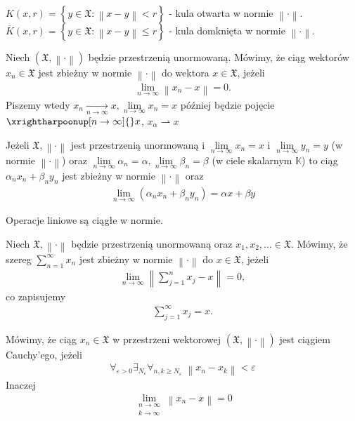 $ K(x,r)=\left\{y\in \mathfrak X:\left\|x-y\right\|<r\right\} $ - kula otwarta w normie $ \left\|\cdot \right\| $.\\
$ \overline K(x,r)=\left\{y\in \mathfrak X:\left\|x-y\right\|\le r\right\} $ - kula domknięta w normie $ \left\|\cdot \right\| $.
\begin{defi}[Zbieżność]
Niech $ \left(\mathfrak X,\left\|\cdot \right\|\right) $ będzie przestrzenią unormowaną. Mówimy, że ciąg wektorów $ x_n\in\mathfrak X $ jest zbieżny w normie $ \left\|\cdot \right\| $ do wektora $ x\in\mathfrak X $, jeżeli
\begin{gather*}
\lim\limits_{n\to\infty} \left\|x_n-x\right\|=0.
\end{gather*}
Piszemy wtedy $ x_n\xrightarrow[n\to\infty ]{}x,\lim\limits_{n\to\infty}x_n=x  $ później będzie pojęcie $ \xrightharpoonup[n\to\infty ]{}x$, $x_\alpha\rightharpoonup x $
\end{defi}
\begin{twr}
Jeżeli $ \mathfrak X,\left\|\cdot \right\| $ jest przestrzenią unormowaną i $ \lim\limits_{n\to\infty} x_n=x $ i $ \lim\limits_{n\to\infty} y_n=y $ (w normie $ \left\|\cdot \right\| $) oraz $ \lim\limits_{n\to\infty}\alpha_n=\alpha,\lim\limits_{n\to\infty}\beta_n=\beta $ (w ciele skalarnym $ \mathbb K $) to ciąg $ \alpha_nx_n+\beta_ny_n $ jest zbieżny w normie $ \left\|\cdot \right\| $ oraz
\begin{gather*}
\lim\limits_{n\to\infty} \left(\alpha_nx_n+\beta_ny_n\right)=\alpha x+\beta y
\end{gather*}
\end{twr}
Operacje liniowe są ciągłe w normie.
\begin{defi}
Niech $ \mathfrak X, \left\|\cdot \right\| $ będzie przestrzenią unormowaną oraz $ x_1,x_2,\dots\in \mathfrak X $. Mówimy, że szereg $ \sum_{n=1}^{\infty }x_n  $ jest zbieżny w normie $ \left\|\cdot \right\| $ do $ x\in \mathfrak X  $, jeżeli
\begin{gather*}
\lim\limits_{n\to\infty}\left\|\sum_{j=1}^{n}x_j-x\right\| =0,
\end{gather*}
co zapisujemy
\begin{gather*}
\sum_{j=1}^{\infty }x_j=x.
\end{gather*}
\end{defi}
\begin{defi}
Mówimy, że ciąg $ x_n\in\mathfrak X $ w przestrzeni wektorowej $ \left(\mathfrak X,\left\|\cdot \right\|\right) $ jest ciągiem Cauchy'ego, jeżeli
\begin{gather*}
\forall_{\varepsilon>0}\exists_{N_\varepsilon}\forall_{n,k\ge N_\varepsilon}\;\left\|x_n-x_k\right\|<\varepsilon
\end{gather*}
Inaczej
\begin{gather*}
\lim\limits_{\substack{n\to\infty \\k\to\infty }} \left\|x_n-x\right\|=0
\end{gather*}
\end{defi}
